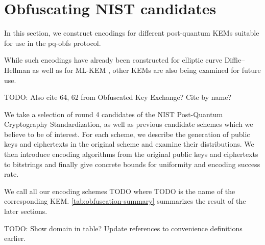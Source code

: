 \chapter{Obfuscating NIST candidates}\label{ch:obfuscation}

In this section, we construct encodings for different post-quantum KEMs suitable for use in the pq-obfs protocol.

While such encodings have already been constructed for elliptic curve Diffie–Hellman \cite{CCS:BHKL13, tor-dev-udh, USENIX:WWGH11} as well as for ML-KEM \cite{CCS:GunSteVei24}, other KEMs are also being examined for future use.

TODO: Also cite 64, 62 from Obfuscated Key Exchange? Cite by name?

We take a selection of round 4 candidates of the NIST Post-Quantum Cryptography Standardization, as well as previous candidate schemes which we believe to be of interest.
For each scheme, we describe the generation of public keys and ciphertexts in the original scheme and examine their distributions. We then introduce encoding algorithms from the original public keys and ciphertexts to bitstrings and finally give concrete bounds for uniformity and encoding success rate.

We call all our encoding schemes TODO where TODO is the name of the corresponding KEM. \cref{tab:obfuscation-summary} summarizes the result of the later sections.

TODO: Show domain in table? Update references to convenience definitions earlier.

